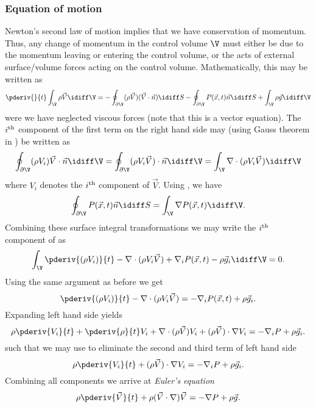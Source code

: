 \subsubsection{Equation of motion}
Newton's second law of motion implies that we have conservation of momentum. Thus, any change of momentum in the control volume $\V$ must either be due to the momentum leaving or entering the control volume, or the acts of external surface/volume forces acting on the control volume. Mathematically, this may be written as
\begin{equation}\label{Eq2:ConservationOfMoment}
	\pderiv{}{t}\int_\V\rho\vec{V}\idiff\V = -\oint_{\partial \V} (\rho \vec{V})(\vec{V}\cdot \vec{n})\idiff S -\oint_{\partial \V}P(\vec{x},t)\vec{n}\idiff S + \int_\V \rho \vec{g}\idiff\V
\end{equation}
were we have neglected viscous forces (note that this is a vector equation). The $i^{\textnormal{th}}$ component of the first term on the right hand side may (using Gauss theorem in ) be written as
\begin{equation*}
	\oint_{\partial \V} (\rho  V_i)\vec{V}\cdot \vec{n}\idiff\V = \oint_{\partial \V} (\rho  V_i\vec{V})\cdot \vec{n}\idiff\V = \int_\V\nabla\cdot (\rho  V_i\vec{V})\idiff\V
\end{equation*}
where $V_i$ denotes the $i^{\textnormal{th}}$ component of $\vec{V}$. Using , we have
\begin{equation*}
	\oint_{\partial \V}P(\vec{x},t)\vec{n}\idiff S = \int_\V\nabla P(\vec{x},t)\idiff\V.
\end{equation*}
Combining these surface integral transformations we may write the $i^{\textnormal{th}}$ component of  as
\begin{equation*}
	\int_\V\pderiv{(\rho V_i)}{t}-\nabla\cdot (\rho  V_i\vec{V}) + \nabla_i P(\vec{x},t)-\rho \vec{g}_i\idiff\V = 0.
\end{equation*}
Using the same argument as before we get
\begin{equation*}
	\pderiv{(\rho V_i)}{t}-\nabla\cdot (\rho  V_i\vec{V}) = -\nabla_i P(\vec{x},t) + \rho \vec{g}_i.
\end{equation*}
Expanding left hand side yields
\begin{equation*}
	\rho\pderiv{ V_i}{t}+\pderiv{\rho}{t} V_i+\nabla\cdot (\rho\vec{V}) V_i+  (\rho \vec{V}) \cdot\nabla V_i= -\nabla_i P + \rho \vec{g}_i.
\end{equation*}
such that we may use  to eliminate the second and third term of left hand side
\begin{equation*}
	\rho\pderiv{ V_i}{t}+ (\rho \vec{V}) \cdot\nabla V_i= -\nabla_i P + \rho \vec{g}_i.
\end{equation*}
Combining all components we arrive at \textit{Euler's equation}
\begin{equation}\label{Eq2:EulerEquation}
	\rho\pderiv{\vec{V}}{t}+ \rho (\vec{V}\cdot\nabla)\vec{V}= -\nabla P + \rho \vec{g}.
\end{equation}
